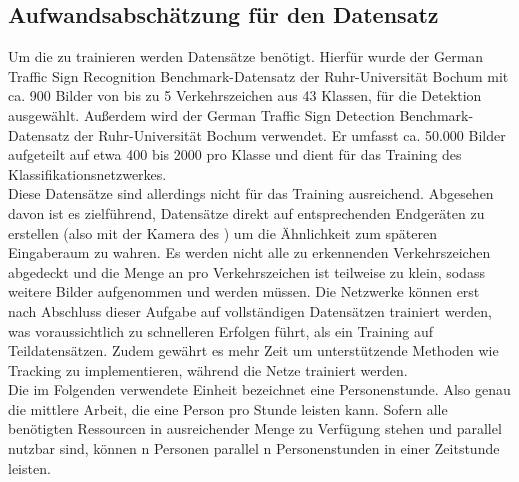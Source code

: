 \subsection{Aufwandsabschätzung für den Datensatz}
\label{info:GTSRB}
Um die  zu trainieren werden Datensätze benötigt. Hierfür wurde der \glqq{}German Traffic Sign Recognition Benchmark\grqq{}-Datensatz der Ruhr-Universität Bochum mit ca. 900 Bilder von bis zu 5 Verkehrszeichen aus 43 Klassen, für die \gls{Detektion} ausgewählt.
Außerdem wird der \glqq{}German Traffic Sign Detection Benchmark\grqq{}-Datensatz der Ruhr-Universität Bochum verwendet. Er umfasst ca. 50.000 Bilder aufgeteilt auf etwa 400 bis 2000  pro Klasse und dient für das Training des Klassifikationsnetzwerkes.\\

Diese Datensätze sind allerdings nicht für das Training ausreichend. Abgesehen davon ist es zielführend, Datensätze direkt auf entsprechenden Endgeräten zu erstellen (also mit der Kamera des ) um die Ähnlichkeit zum späteren Eingaberaum zu wahren. Es werden nicht alle zu erkennenden Verkehrszeichen abgedeckt und die Menge an  pro Verkehrszeichen ist teilweise zu klein, sodass weitere Bilder aufgenommen und  werden müssen. Die Netzwerke können erst nach Abschluss dieser Aufgabe auf vollständigen Datensätzen trainiert werden, was voraussichtlich zu schnelleren Erfolgen führt, als ein Training auf Teildatensätzen. Zudem gewährt es mehr Zeit um unterstützende Methoden wie \gls{Tracking} zu implementieren, während die Netze trainiert werden.\\

Die im Folgenden verwendete Einheit \si{\PS} bezeichnet eine Personenstunde. Also genau die mittlere Arbeit, die eine Person pro Stunde leisten kann. Sofern alle benötigten Ressourcen in ausreichender Menge zu Verfügung stehen und parallel nutzbar sind, können n Personen parallel n Personenstunden in einer Zeitstunde leisten.\\

